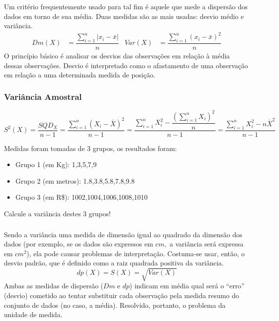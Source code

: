 \documentclass[14pt,aspectratio=1610]{beamer}
\begin{document}
\begin{frame}{}
\frametitle{}
\begin{block}{}
\justifying
Um critério frequentemente usado para tal fim é aquele que mede a dispersão dos dados em torno de sua média. Duas medidas são as mais usadas: desvio médio e variância.
\begin{align*}
Dm(X) &=\displaystyle \dfrac{{\displaystyle \sum_{i=1}^{n}|x_{i}-\bar{x}|}}{n}&
Var(X)&=\displaystyle \dfrac{{\displaystyle \sum_{i=1}^{n}(x_{i}-\bar{x})^{2}}}{n}
\end{align*}
O princípio básico é analisar os desvios das observações em relação à média dessas observações. Desvio é interpretado como o afastamento de uma observação em relação a uma determinada medida de posição.
\end{block}
\end{frame}

\begin{frame}{}
    \frametitle{Variância Amostral}
    \begin{block}{}
    \justifying
    \begin{equation*}
	S^2(X) = \dfrac{{SQD_X }}{{n - 1}} = \dfrac{{\sum\limits_{i = 1}^n {\left( {X_i  - \bar X} \right)^2 } }}{{n - 1}} = \dfrac{{\sum\limits_{i = 1}^n {X_i^2  - \dfrac{{\left( {\sum\limits_{i = 1}^n {X_i } } \right)^2 }}{n}} }}{{n - 1}}  = \dfrac{\sum\limits_{i = 1}^n {X_i^2  - n \bar{X}^2}}{n-1}
	\end{equation*}
    \end{block}
    \pause
    \begin{block}{}
    Medidas foram tomadas de 3 grupos, os resultados foram:
    	\begin{itemize}
		\item Grupo 1 (em Kg): 1,3,5,7,9
		\item Grupo 2 (em metros): 1.8,3.8,5.8,7.8,9.8 
		\item Grupo 3 (em R\$): 1002,1004,1006,1008,1010
	\end{itemize}
	Calcule a variância destes 3 grupos!
    \end{block}
\end{frame}

\begin{frame}{}
\frametitle{}
\begin{block}{}
\justifying
Sendo a variância uma medida de dimensão igual ao quadrado da dimensão dos dados (por exemplo, se os dados são expressos em $cm,$ a variância será expressa 
em $cm^{2}$), ela pode causar problemas de interpretação. Costuma-se usar, então, o desvio padrão, que é definido como a raiz quadrada positiva da variância.
\begin{equation}
dp(X)=S(X)=\sqrt{Var(X)}
\end{equation}
Ambas as medidas de dispersão ($Dm$ e $dp$) indicam em média qual será o ``erro'' (desvio) cometido ao tentar substituir cada observação pela medida resumo do conjunto de dados (no caso, a média). Resolvido, portanto, o problema da unidade de medida.
\end{block}
\end{frame}
\end{document}

